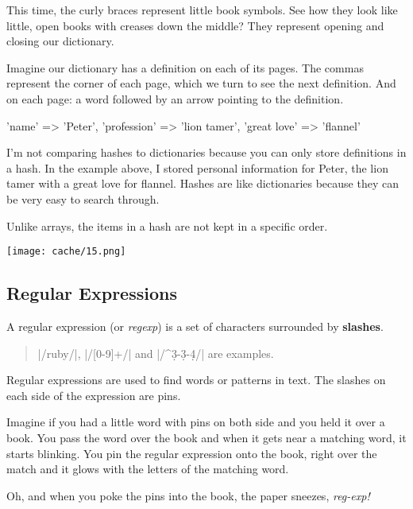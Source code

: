 \documentclass[12pt,twoside]{report}
\begin{document}
This time, the curly braces represent little book symbols.  See how
they look like little, open books with creases down the middle?  They
represent opening and closing our dictionary.

Imagine our dictionary has a definition on each of its pages.  The
commas represent the corner of each page, which we turn to see the
next definition.  And on each page: a word followed by an arrow
pointing to the definition.


\begin{rubycode}

 {
   'name' => 'Peter',
   'profession' => 'lion tamer',
   'great love' => 'flannel'
 }

\end{rubycode}


I'm not comparing hashes to dictionaries because you can only store
definitions in a hash.  In the example above, I stored personal
information for Peter, the lion tamer with a great love for flannel.
Hashes are like dictionaries because they can be very easy to search
through.

Unlike arrays, the items in a hash are not kept in a specific order.

	\texttt{[image: cache/15.png]}




\subsection{Regular Expressions}



A regular expression (or {\em regexp}) is a set of characters
surrounded by {\bf slashes}.

\begin{quote}
\rubyinline|/ruby/|,
\rubyinline|/[0-9]+/| and
\rubyinline|/^\d{3}-\d{3}-\d{4}/| are
examples.\end{quote}


Regular expressions are used to find words or patterns in text.  The
slashes on each side of the expression are pins.

Imagine if you had a little word with pins on both side and you held
it over a book.  You pass the word over the book and when it gets near
a matching word, it starts blinking.  You pin the regular expression
onto the book, right over the match and it glows with the letters of
the matching word.

Oh, and when you poke the pins into the book, the paper sneezes, {\em
  reg-exp!}
\end{document}
